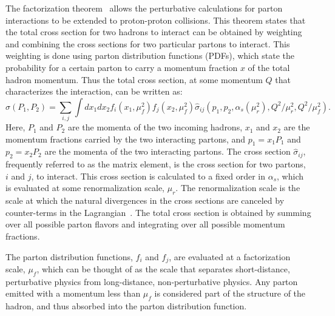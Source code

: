 The factorization theorem~\cite{Collins:1989gx} allows the perturbative calculations for parton interactions to be extended to proton-proton collisions. This theorem states that the total cross section for two hadrons to interact can be obtained by weighting and combining the cross sections for two particular partons to interact. This weighting is done using parton distribution functions (PDFs), which state the probability for a certain parton to carry a momentum fraction $x$ of the total hadron momentum. Thus the total cross section, at some momentum $Q$ that characterizes the interaction, can be written as:
%
\begin{equation}
\sigma(P_1,P_2) = \sum_{i,j} \int dx_1 dx_2 f_i(x_1,\mu^2_f) f_j(x_2,\mu^2_f) \hat{\sigma}_{ij}(p_1,p_2,\alpha_s(\mu^2_r),Q^2/\mu^2_r,Q^2/\mu^2_f).
\end{equation}
%
Here, $P_1$ and $P_2$ are the momenta of the two incoming hadrons, $x_1$ and $x_2$ are the momentum fractions carried by the two interacting partons, and $p_1 = x_1P_1$ and $p_2 = x_2P_2$ are the momenta of the two interacting partons. The cross section $\hat{\sigma}_{ij}$, frequently referred to as the matrix element, is the cross section for two partons, $i$ and $j$, to interact.  This cross section is calculated to a fixed order in $\alpha_s$, which is evaluated at some renormalization scale, $\mu_r$.  The renormalization scale is the scale at which the natural divergences in the cross sections are canceled by counter-terms in the Lagrangian~\cite{tHooft1973455,PhysRevD.8.3497}.  
The total cross section is obtained by summing over all possible parton flavors and integrating over all possible momentum fractions. 

The parton distribution functions, $f_i$ and $f_j$, are evaluated at a factorization scale, $\mu_f$, which can be thought of as the scale that separates short-distance, perturbative physics from long-distance, non-perturbative physics.  Any parton emitted with a momentum less than $\mu_f$ is considered part of the structure of the hadron, and thus absorbed into the parton distribution function.  

